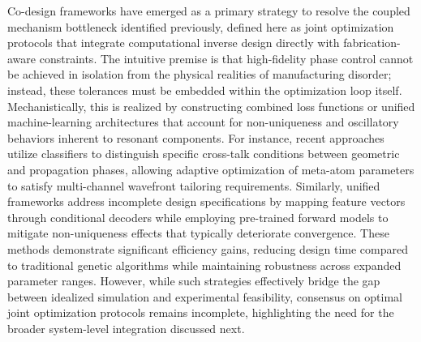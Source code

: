 Co-design frameworks have emerged as a primary strategy to resolve the coupled mechanism bottleneck identified previously, defined here as joint optimization protocols that integrate computational inverse design directly with fabrication-aware constraints. The intuitive premise is that high-fidelity phase control cannot be achieved in isolation from the physical realities of manufacturing disorder; instead, these tolerances must be embedded within the optimization loop itself. Mechanistically, this is realized by constructing combined loss functions or unified machine-learning architectures that account for non-uniqueness and oscillatory behaviors inherent to resonant components. For instance, recent approaches utilize classifiers to distinguish specific cross-talk conditions between geometric and propagation phases, allowing adaptive optimization of meta-atom parameters to satisfy multi-channel wavefront tailoring requirements. Similarly, unified frameworks address incomplete design specifications by mapping feature vectors through conditional decoders while employing pre-trained forward models to mitigate non-uniqueness effects that typically deteriorate convergence. These methods demonstrate significant efficiency gains, reducing design time compared to traditional genetic algorithms while maintaining robustness across expanded parameter ranges. However, while such strategies effectively bridge the gap between idealized simulation and experimental feasibility, consensus on optimal joint optimization protocols remains incomplete, highlighting the need for the broader system-level integration discussed next. \citep{doi_10_1117_1_apn_2_1_016010_57069347} \citep{doi_10_1515_nanoph_2020_0379_1cc596ab} \citep{doi_10_23919_piers_fall62445_2025_11394631_4fdb8517}

